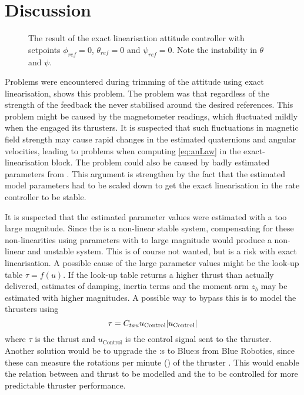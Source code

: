 \section{Discussion}
\begin{figure}
\centering
  \qquad
  \qquad
  \caption{\label{fig:ExactLinAttitude}%
  The result of the exact linearisation attitude controller with setpoints $\phi_{ref}=0$, $\theta_{ref}=0$ and $\psi_{ref}=0$. Note the instability in $\theta$ and $\psi$.}
\end{figure}

Problems were encountered during trimming of the attitude \abbrPID using exact linearisation,  shows this problem. The problem was that regardless of the strength of the feedback the \abbrROV never stabilised around the desired references. This problem might be caused by the magnetometer readings, which fluctuated mildly when the \abbrROV engaged its thrusters. It is suspected that such fluctuations in magnetic field strength may cause rapid changes in the estimated quaternions and angular velocities, leading to problems when computing \eqref{eq:anLaw} in the exact-linearisation block. The problem could also be caused by badly estimated parameters from . This argument is strengthen by the fact that the estimated model parameters had to be scaled down to get the exact linearisation in the rate controller to be stable. 

It is suspected that the estimated parameter values were estimated with a too large magnitude. Since the \abbrROV is a non-linear stable system, compensating for these non-linearities using parameters with to large magnitude would produce a non-linear and unstable system. This is of course not wanted, but is a risk with exact linearisation. A possible cause of the large parameter values might be the look-up table $\tau = f(u)$. If the look-up table returns a higher thrust than actually delivered, estimates of damping, inertia terms and the moment arm $z_b$ may be estimated with higher magnitudes. A possible way to bypass this is to model the thrusters using \begin{equation}
\tau=C_{tau}u_{\text{Control}}|u_{\text{Control}}|
\end{equation} where $\tau$ is the thrust and $u_{\text{Control}}$ is the control signal sent to the thruster. 
Another solution would be to upgrade the \abbrESC:s to Blue\abbrESC:s from Blue Robotics, since these can measure the rotations per minute (\abbrRPM) of the thruster \citep{bluerobotics}. This would enable the relation between \abbrRPM and thrust to be modelled and the \abbrRPM to be controlled for more predictable thruster performance.  

